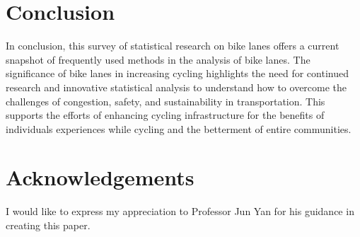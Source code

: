\documentclass[12pt, letterpaper]{article}
\begin{document}
\section{Conclusion}
\label{sec:conc}

In conclusion, this survey of statistical research on bike lanes offers a current snapshot of frequently used methods in the analysis of bike lanes. The significance of bike lanes in increasing cycling highlights the need for continued research and innovative statistical analysis to understand how to overcome the challenges of congestion, safety, and sustainability in transportation. This supports the efforts of enhancing cycling infrastructure for the benefits of individuals experiences while cycling and the betterment of entire communities. 


\section{Acknowledgements}
\label{sec:acknow}

I would like to express my appreciation to Professor Jun Yan for his guidance in creating this paper. 


\end{document}
